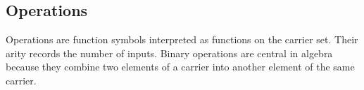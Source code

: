 \subsection*{Operations}
\label{subsec:structure-operations}

\begin{remark*}[Exposition]
Operations are function symbols interpreted as functions on the carrier set.
Their arity records the number of inputs.  Binary operations are central in
algebra because they combine two elements of a carrier into another element of
the same carrier.
\end{remark*}
